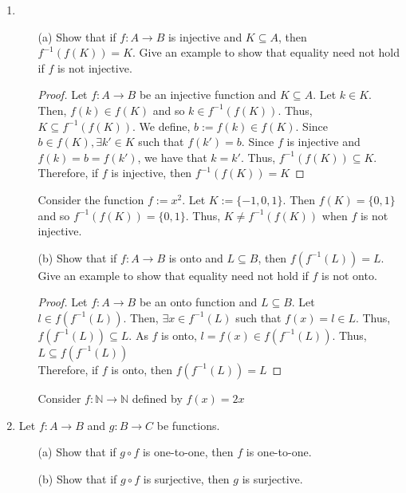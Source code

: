 \documentclass[12pt]{article}
\newcommand{\N}{\mathbb{N}}
\begin{document}
\begin{enumerate}
    \item 
    \begin{itemize}
        \item[(a)] Show that if $f : A \to B$ is injective and $K \subseteq A$, then $f^{-1}(f(K))=K$. Give an example to show that equality need not hold if $f$ is not injective.\\
        \begin{proof}
    		Let $ f:A\to B $ be an injective function and $ K\subseteq A $. Let $ k\in K $. Then, $ f(k)\in f(K) $ and so $ k\in f^{-1}(f(K)) $. Thus, $ K\subseteq f^{-1}(f(K)) $. We define, $ b := f(k)\in f(K) $. Since $ b\in f(K), \exists k'\in K $ such that $ f(k')=b $. Since  $f$ is injective and $ f(k) = b = f(k') $, we have that $ k = k' $. Thus, $ f^{-1}(f(K))\subseteq K $. Therefore, if $ f $ is injective, then $ f^{-1}(f(K)) = K $
        \end{proof}
    	Consider the function $ f:=x^2 $. Let $ K:=\{-1,0,1\} $. Then $ f(K)=\{0,1\} $ and so $ f^{-1}(f(K))=\{0,1\} $. Thus, $ K \neq f^{-1}(f(K)) $ when $ f $ is not injective.
    	
        \item[(b)]  Show that if $f : A \to B$ is onto and $L \subseteq B$, then $f(f^{-1}(L))=L$. Give an example to show that equality need not hold if $f$ is not onto.\\
	     \begin{proof}
	       	Let $ f:A\to B $ be an onto function and $ L\subseteq B $. Let $ l\in f(f^{-1}(L)) $. Then, $\exists x\in f^{-1}(L)$ such that $ f(x)=l\in L $. Thus, $ f(f^{-1}(L))\subseteq L $. As $ f $ is onto, $ l = f(x) \in f(f^{-1}(L)) $. Thus, $ L \subseteq f(f^{-1}(L)) $\\
	       	Therefore, if $ f $ is onto, then $ f(f^{-1}(L))=L $ 
	    \end{proof}
    	Consider $ f:\N\to\N $ defined by $ f(x)=2x $
    \end{itemize}
        
    \item Let $f : A \to B$ and $g : B \to C$ be functions.
    \begin{itemize}
        \item[(a)] Show that if $g \circ f$ is one-to-one, then $f$ is one-to-one.\\
        \item[(b)] Show that if $g \circ f$ is surjective, then $g$ is surjective.
    \end{itemize}


\end{enumerate}
\end{document}
